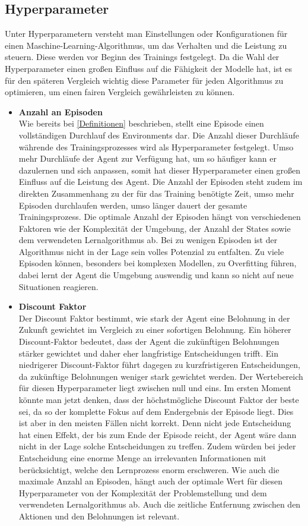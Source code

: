 \subsection{Hyperparameter}\label{Def_Hyperparameter}
Unter Hyperparametern versteht man Einstellungen oder Konfigurationen für einen Maschine-Learning-Algorithmus, um das Verhalten und die Leistung zu steuern. Diese werden vor Beginn des Trainings festgelegt. Da die Wahl der Hyperparameter einen großen Einfluss auf die Fähigkeit der Modelle hat, ist es für den späteren Vergleich wichtig diese Parameter für jeden Algorithmus zu optimieren, um einen fairen Vergleich gewährleisten zu können.
\begin{itemize}
    \item \textbf{Anzahl an Episoden}\\
    Wie bereits bei \ref*{Definitionen}  beschrieben, stellt eine Episode einen vollständigen Durchlauf des Environments dar. Die Anzahl dieser Durchläufe währende des Trainingsprozesses wird als Hyperparameter festgelegt. Umso mehr Durchläufe der Agent zur Verfügung hat, um so häufiger kann er dazulernen und sich anpassen, somit hat dieser Hyperparameter einen großen Einfluss auf die Leistung des Agent. Die Anzahl der Episoden steht zudem im direkten Zusammenhang zu der für das Training benötigte Zeit, umso mehr Episoden durchlaufen werden, umso länger dauert der gesamte Trainingsprozess. Die optimale Anzahl der Episoden hängt von verschiedenen Faktoren wie der Komplexität der Umgebung, der Anzahl der States sowie dem verwendeten Lernalgorithmus ab. Bei zu wenigen Episoden ist der Algorithmus nicht in der Lage sein volles Potenzial zu entfalten. Zu viele Episoden können, besonders bei komplexen Modellen, zu Overfitting führen, dabei lernt der Agent die Umgebung auswendig und kann so nicht auf neue Situationen reagieren.
    \item \textbf{Discount Faktor}\\
    Der Discount Faktor bestimmt, wie stark der Agent eine Belohnung in der Zukunft gewichtet im Vergleich zu einer sofortigen Belohnung. Ein höherer Discount-Faktor bedeutet, dass der Agent die zukünftigen Belohnungen stärker gewichtet und daher eher langfristige Entscheidungen trifft. Ein niedrigerer Discount-Faktor führt dagegen zu kurzfristigeren Entscheidungen, da zukünftige Belohnungen weniger stark gewichtet werden. Der Wertebereich für diesen Hyperparameter liegt zwischen null und eins. Im ersten Moment könnte man jetzt denken, dass der höchstmögliche Discount Faktor der beste sei, da so der komplette Fokus auf dem Endergebnis der Episode liegt. Dies ist aber in den meisten Fällen nicht korrekt. Denn nicht jede Entscheidung hat einen Effekt, der bis zum Ende der Episode reicht, der Agent wäre dann nicht in der Lage solche Entscheidungen zu treffen. Zudem würden bei jeder Entscheidung eine enorme Menge an irrelevanten Informationen mit berücksichtigt, welche den Lernprozess enorm erschweren. Wie auch die maximale Anzahl an Episoden, hängt auch der optimale Wert für diesen Hyperparameter von der Komplexität der Problemstellung und dem verwendeten Lernalgorithmus ab. Auch die zeitliche Entfernung zwischen den Aktionen und den Belohnungen ist relevant.

\end{itemize}
